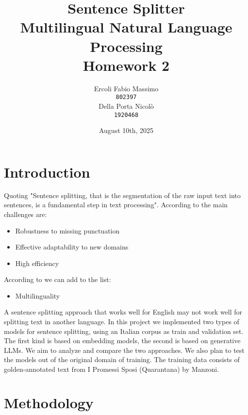 \documentclass[11pt]{article}
\title{
	Sentence Splitter\\
	\large Multilingual Natural Language Processing \\
	Homework 2}
\date{August 10th, 2025}
\author{Ercoli Fabio Massimo \\
\texttt{802397} \\\And
Della Porta Nicolò \\
\texttt{1920468} \\}
\begin{document}
\maketitle

\section{Introduction}

Quoting \cite{redaelli-sprugnoli-2024-sentence} "Sentence splitting, that is the segmentation of the raw input text into sentences, is a fundamental step in text processing".  According to \cite{frohmann2024segmenttextuniversalapproach} the main challenges are:
\begin{itemize}
	\item Robustness to missing punctuation
	\item Effective adaptability to new domains
	\item High efficiency
\end{itemize}
According to \cite{redaelli-sprugnoli-2024-sentence} we can add to the list:
\begin{itemize}
	\item Multilinguality
\end{itemize}
A sentence splitting approach that works well for English may not work well for splitting text in another language. \newline In this project we implemented two types of models for sentence splitting, using an Italian corpus as train and validation set.
The first kind is based on embedding models, the second is based on generative LLMs.
We aim to analyze and compare the two approaches. 
We also plan to test the models out of the original domain of training. 
The training data consists of golden-annotated text from I Promessi Sposi (Quarantana) by Manzoni.

\section{Methodology}
\end{document}
